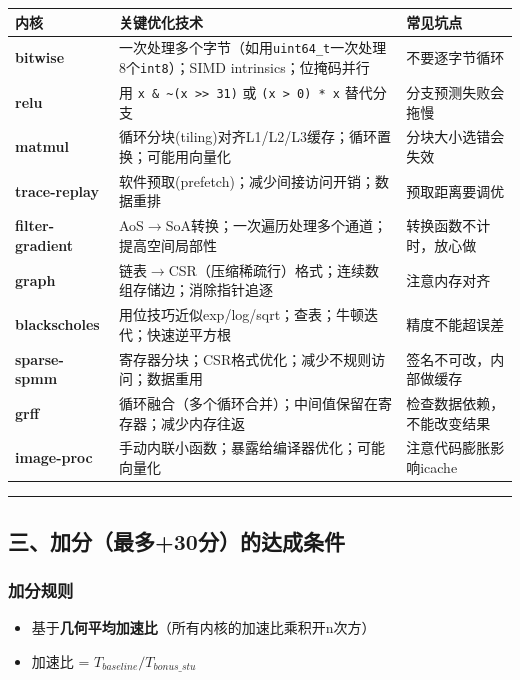 \documentclass[11pt, a4paper]{article}
\begin{document}
\begin{aibox}
\vspace{0.5em}
\begin{tabularx}{\textwidth}{@{} l X X @{}}
\toprule
内核 & 关键优化技术 & 常见坑点 \\
\midrule
\textbf{bitwise} & 一次处理多个字节（如用\texttt{uint64\_t}一次处理8个\texttt{int8}）；SIMD intrinsics；位掩码并行 & 不要逐字节循环 \\
\textbf{relu} & 用 \texttt{x \& \textasciitilde{}(x >> 31)} 或 \texttt{(x > 0) * x} 替代分支 & 分支预测失败会拖慢 \\
\textbf{matmul} & 循环分块(tiling)对齐L1/L2/L3缓存；循环置换；可能用向量化 & 分块大小选错会失效 \\
\textbf{trace-replay} & 软件预取(prefetch)；减少间接访问开销；数据重排 & 预取距离要调优 \\
\textbf{filter-gradient} & AoS$\rightarrow$SoA转换；一次遍历处理多个通道；提高空间局部性 & 转换函数不计时，放心做 \\
\textbf{graph} & 链表$\rightarrow$CSR（压缩稀疏行）格式；连续数组存储边；消除指针追逐 & 注意内存对齐 \\
\textbf{blackscholes} & 用位技巧近似exp/log/sqrt；查表；牛顿迭代；快速逆平方根 & 精度不能超误差 \\
\textbf{sparse-spmm} & 寄存器分块；CSR格式优化；减少不规则访问；数据重用 & 签名不可改，内部做缓存 \\
\textbf{grff} & 循环融合（多个循环合并）；中间值保留在寄存器；减少内存往返 & 检查数据依赖，不能改变结果 \\
\textbf{image-proc} & 手动内联小函数；暴露给编译器优化；可能向量化 & 注意代码膨胀影响icache \\
\bottomrule
\end{tabularx}
\vspace{0.5em}

\begin{center}\rule{\textwidth}{0.4pt}\end{center}

\subsection*{三、加分（最多+30分）的达成条件}

\subsubsection*{加分规则}
\begin{itemize}
    \item 基于\textbf{几何平均加速比}（所有内核的加速比乘积开n次方）
    \item 加速比 = $T_{baseline} / T_{bonus\_stu}$
\end{itemize}


\end{aibox}
\end{document}

